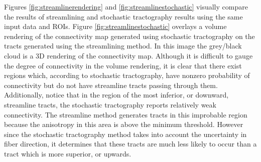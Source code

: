 Figures \ref{fig:streamlinerendering} and \ref{fig:streamlinestochastic} visually compare the results of streamlining and stochastic tractography results using the same input data and ROIs.  Figure \ref{fig:streamlinestochastic} overlays a volume rendering of the connectivity map generated using stochastic tractography on the tracts generated using the streamlining method.  In this image the grey/black cloud is a 3D rendering of the connectivity map.  Although it is difficult to gauge the degree of connectivity in the volume rendering, it is clear that there exist regions which, according to stochastic tractography, have nonzero probability of connectivity but do not have streamline tracts passing through them.  Additionally, notice that in the region of the most inferior, or downward, streamline tracts, the stochastic tractography reports relatively weak connectivity.  The streamline method generates tracts in this improbable region because the anisotropy in this area is above the minimum threshold.  However since the stochastic tractography method takes into account the uncertainty in fiber direction, it determines that these tracts are much less likely to occur than a tract which is more superior, or upwards.

